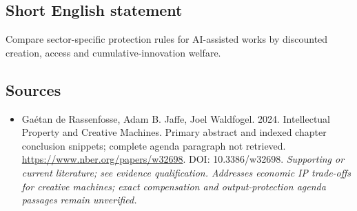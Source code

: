 \documentclass[11pt]{article}
\begin{document}
\subsection{Short English statement}
Compare sector-specific protection rules for AI-assisted works by discounted creation, access and cumulative-innovation welfare.

\subsection{Sources}
\begin{itemize}\raggedright
\item[\textnormal{[S1]}]\hypertarget{source:30007698:1}{} Gaétan de Rassenfosse, Adam B. Jaffe, Joel Waldfogel. 2024. Intellectual Property and Creative Machines. Primary abstract and indexed chapter conclusion snippets; complete agenda paragraph not retrieved.
\url{https://www.nber.org/papers/w32698}.
DOI: 10.3386/w32698.
{\small\textit{Supporting or current literature; see evidence qualification. Addresses economic IP trade-offs for creative machines; exact compensation and output-protection agenda passages remain unverified.}}
\end{itemize}
\end{document}
